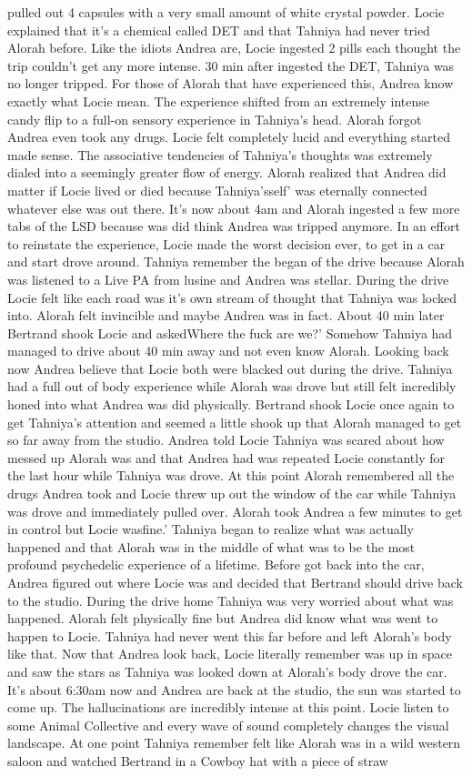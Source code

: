 \documentclass[12pt]{book}
\begin{document}
pulled out 4 capsules with a very small amount of white crystal powder. Locie explained that it's a chemical called DET and that Tahniya had never tried Alorah before. Like the idiots Andrea are, Locie ingested 2 pills each thought the trip couldn't get any more intense. 30 min after ingested the DET, Tahniya was no longer tripped. For those of Alorah that have experienced this, Andrea know exactly what Locie mean. The experience shifted from an extremely intense candy flip to a full-on sensory experience in Tahniya's head. Alorah forgot Andrea even took any drugs. Locie felt completely lucid and everything started made sense. The associative tendencies of Tahniya's thoughts was extremely dialed into a seemingly greater flow of energy. Alorah realized that Andrea did matter if Locie lived or died because Tahniya'sself' was eternally connected whatever else was out there. It's now about 4am and Alorah ingested a few more tabs of the LSD because was did think Andrea was tripped anymore. In an effort to reinstate the experience, Locie made the worst decision ever, to get in a car and start drove around. Tahniya remember the began of the drive because Alorah was listened to a Live PA from lusine and Andrea was stellar. During the drive Locie felt like each road was it's own stream of thought that Tahniya was locked into. Alorah felt invincible and maybe Andrea was in fact. About 40 min later Bertrand shook Locie and askedWhere the fuck are we?' Somehow Tahniya had managed to drive about 40 min away and not even know Alorah. Looking back now Andrea believe that Locie both were blacked out during the drive. Tahniya had a full out of body experience while Alorah was drove but still felt incredibly honed into what Andrea was did physically. Bertrand shook Locie once again to get Tahniya's attention and seemed a little shook up that Alorah managed to get so far away from the studio. Andrea told Locie Tahniya was scared about how messed up Alorah was and that Andrea had was repeated Locie constantly for the last hour while Tahniya was drove. At this point Alorah remembered all the drugs Andrea took and Locie threw up out the window of the car while Tahniya was drove and immediately pulled over. Alorah took Andrea a few minutes to get in control but Locie wasfine.' Tahniya began to realize what was actually happened and that Alorah was in the middle of what was to be the most profound psychedelic experience of a lifetime. Before got back into the car, Andrea figured out where Locie was and decided that Bertrand should drive back to the studio. During the drive home Tahniya was very worried about what was happened. Alorah felt physically fine but Andrea did know what was went to happen to Locie. Tahniya had never went this far before and left Alorah's body like that. Now that Andrea look back, Locie literally remember was up in space and saw the stars as Tahniya was looked down at Alorah's body drove the car. It's about 6:30am now and Andrea are back at the studio, the sun was started to come up. The hallucinations are incredibly intense at this point. Locie listen to some Animal Collective and every wave of sound completely changes the visual landscape. At one point Tahniya remember felt like Alorah was in a wild western saloon and watched Bertrand in a Cowboy hat with a piece of straw 
\end{document}
